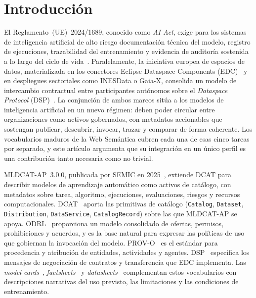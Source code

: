 \documentclass[Afour,sagev,times]{sagej}
\newcommand{\code}[1]{\texttt{#1}}
\begin{document}

\maketitle

\section{Introducción}\label{sec:intro}

El Reglamento~(UE)~2024/1689, conocido como \emph{AI Act}, exige para los sistemas de inteligencia artificial de alto riesgo documentación técnica del modelo, registro de ejecuciones, trazabilidad del entrenamiento y evidencia de auditoría sostenida a lo largo del ciclo de vida~\cite{aiact}. Paralelamente, la iniciativa europea de espacios de datos, materializada en los conectores Eclipse Dataspace Components (EDC)~\cite{edc} y en despliegues sectoriales como INESData o Gaia-X, consolida un modelo de intercambio contractual entre participantes autónomos sobre el \emph{Dataspace Protocol} (DSP)~\cite{dsp}. La conjunción de ambos marcos sitúa a los modelos de inteligencia artificial en un nuevo régimen: deben poder circular entre organizaciones como activos gobernados, con metadatos accionables que sostengan publicar, descubrir, invocar, trazar y comparar de forma coherente. Los vocabularios maduros de la Web Semántica cubren cada una de esas cinco tareas por separado, y este artículo argumenta que su integración en un único perfil es una contribución tanto necesaria como no trivial.

MLDCAT-AP~3.0.0, publicada por SEMIC en 2025~\cite{mldcatap}, extiende DCAT para describir modelos de aprendizaje automático como activos de catálogo, con metadatos sobre tarea, algoritmo, ejecuciones, evaluaciones, riesgos y recursos computacionales. DCAT~\cite{dcat2} aporta las primitivas de catálogo (\code{Catalog}, \code{Dataset}, \code{Distribution}, \code{DataService}, \code{CatalogRecord}) sobre las que MLDCAT-AP se apoya. ODRL~\cite{odrl22} proporciona un modelo consolidado de ofertas, permisos, prohibiciones y acuerdos, y es la base natural para expresar las políticas de uso que gobiernan la invocación del modelo. PROV-O~\cite{provo} es el estándar para procedencia y atribución de entidades, actividades y agentes. DSP~\cite{dsp} especifica los mensajes de negociación de contratos y transferencia que EDC implementa. Las \emph{model cards}~\cite{mitchell19}, \emph{factsheets}~\cite{arnold19} y \emph{datasheets}~\cite{gebru21} complementan estos vocabularios con descripciones narrativas del uso previsto, las limitaciones y las condiciones de entrenamiento.
\end{document}

